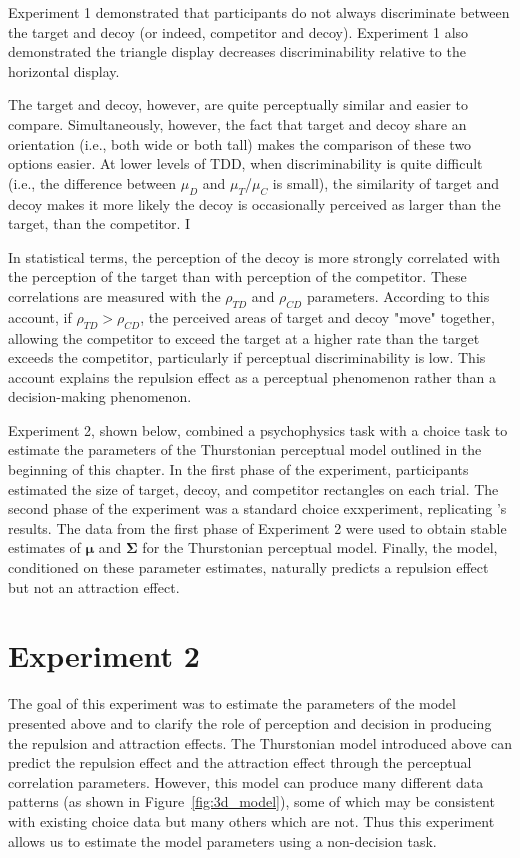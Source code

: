 Experiment 1 demonstrated that participants do not always discriminate between the target and decoy (or indeed, competitor and decoy). Experiment 1 also demonstrated the triangle display decreases discriminability relative to the horizontal display.

The target and decoy, however, are quite perceptually similar and easier to compare. Simultaneously, however, the fact that target and decoy share an orientation (i.e., both wide or both tall) makes the comparison of these two options easier. At lower levels of TDD, when discriminability is quite difficult (i.e., the difference between $\mu_{D}$ and $\mu_{T}$/$\mu_{C}$ is small), the similarity of target and decoy makes it more likely the decoy is occasionally perceived as larger than the target, than the competitor. I

In statistical terms, the perception of the decoy is more strongly correlated with the perception of the target than with perception of the competitor. These correlations are measured with the $\rho_{TD}$ and $\rho_{CD}$ parameters. According to this account, if $\rho_{TD}>\rho_{CD}$, the perceived areas of target and decoy "move" together, allowing the competitor to exceed the target at a higher rate than the target exceeds the competitor, particularly if perceptual discriminability is low. This account explains the repulsion effect as a perceptual phenomenon rather than a decision-making phenomenon.

Experiment 2, shown below, combined a psychophysics task with a choice task to estimate the parameters of the Thurstonian perceptual model outlined in the beginning of this chapter. In the first phase of the experiment, participants estimated the size of target, decoy, and competitor rectangles on each trial. The second phase of the experiment was a standard choice exxperiment, replicating \textcite{spektorWhenGoodLooks2018b}'s results. The data from the first phase of Experiment 2 were used to obtain stable estimates of  $\boldsymbol{\mu}$ and $\boldsymbol{\Sigma}$ for the Thurstonian perceptual model. Finally, the model, conditioned on these parameter estimates, naturally predicts a repulsion effect but not an attraction effect.  

\section{Experiment 2}
The goal of this experiment was to estimate the parameters of the model presented above and to clarify the role of perception and decision in producing the repulsion and attraction effects. The Thurstonian model introduced above can predict the repulsion effect and the attraction effect through the perceptual correlation parameters. However, this model can produce many different data patterns (as shown in Figure~\ref{fig:3d_model}), some of which may be consistent with existing choice data but many others which are not. Thus this experiment allows us to estimate the model parameters using a non-decision task.

